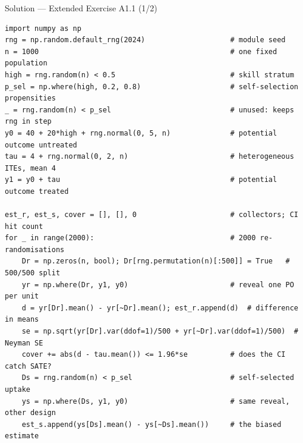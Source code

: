 \documentclass[aspectratio=169,11pt]{beamer}
\begin{document}
\begin{frame}[fragile]{Solution --- Extended Exercise A1.1 (1/2)}
\begin{solutionbox}
\begin{lstlisting}[basicstyle=\ttfamily\fontsize{6.5}{7.6}\selectfont]
import numpy as np
rng = np.random.default_rng(2024)                    # module seed
n = 1000                                             # one fixed population
high = rng.random(n) < 0.5                           # skill stratum
p_sel = np.where(high, 0.2, 0.8)                     # self-selection propensities
_ = rng.random(n) < p_sel                            # unused: keeps rng in step
y0 = 40 + 20*high + rng.normal(0, 5, n)              # potential outcome untreated
tau = 4 + rng.normal(0, 2, n)                        # heterogeneous ITEs, mean 4
y1 = y0 + tau                                        # potential outcome treated

est_r, est_s, cover = [], [], 0                      # collectors; CI hit count
for _ in range(2000):                                # 2000 re-randomisations
    Dr = np.zeros(n, bool); Dr[rng.permutation(n)[:500]] = True   # 500/500 split
    yr = np.where(Dr, y1, y0)                        # reveal one PO per unit
    d = yr[Dr].mean() - yr[~Dr].mean(); est_r.append(d)  # difference in means
    se = np.sqrt(yr[Dr].var(ddof=1)/500 + yr[~Dr].var(ddof=1)/500)  # Neyman SE
    cover += abs(d - tau.mean()) <= 1.96*se          # does the CI catch SATE?
    Ds = rng.random(n) < p_sel                       # self-selected uptake
    ys = np.where(Ds, y1, y0)                        # same reveal, other design
    est_s.append(ys[Ds].mean() - ys[~Ds].mean())     # the biased estimate
\end{lstlisting}
\end{solutionbox}
\end{frame}
\end{document}
